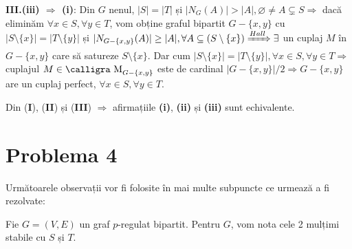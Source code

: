 \documentclass[a4paper,12pt]{article}
\begin{document}
\textbf{III.(iii) $\Rightarrow$ (i)}: Din $G$ nenul, $|S| = |T|$ și $|N_G(A)| > |A|, \varnothing \neq A \subsetneq S \Rightarrow$ dacă eliminăm $\forall x \in S, \forall y \in T$, vom obține graful bipartit $G-\{x,y\}$ cu $|S\setminus \{x\}| = |T\setminus \{y\}|$ și $|N_{G-\{x,y\}}(A)| \geq |A|, \forall A \subseteq \left(S\setminus \{x\} \right) \xRightarrow{Hall} \exists$ un cuplaj $M$ în $G-\{x,y\}$ care să satureze $S\setminus \{x\}$. Dar  cum $|S\setminus \{x\}| = |T\setminus \{y\}|, \forall x \in S, \forall y \in T \Rightarrow$  cuplajul $M \in \text{{\calligra M}}_{G-\{x,y\}}$ este de cardinal $|G-\{x,y\}|/2 \Rightarrow G-\{x,y\}$ are un cuplaj perfect, $\forall x \in S, \forall y \in T$.

Din (\textbf{I}), (\textbf{II}) și (\textbf{III}) $\Rightarrow$ afirmațiile \textbf{(i)}, \textbf{(ii)} și \textbf{(iii)} sunt echivalente.

\section {Problema 4}

Următoarele observații vor fi folosite în mai multe subpuncte ce urmează a fi rezolvate:

Fie $G = (V,E)$ un graf $p$-regulat bipartit. Pentru $G$, vom nota cele 2 mulțimi stabile cu $S$ și $T$.
\end{document}
